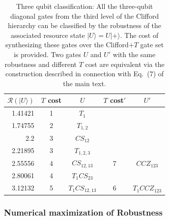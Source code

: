 \documentclass[aps,prl,twocolumn,showpacs,superscriptaddress,groupedaddress,amsmath,amssymb]{revtex4-1}  %
\def\ket #1{\vert #1\rangle}
\begin{document}
\begin{table}[h]
\centering
\begin{tabular}{rcccc}
\hline
$\mathcal{R}(\ket{U})$ & $T$ cost & $U$   & $T$ cost$'$  & $U'$  \\
\hline
1.41421 \quad  & 1 &$T_1$ &  &  \\
1.74755 \quad  & 2 &$T_{1,2}$&  &   \\
2.2     \quad  & 3 &$CS_{12}$&  & \\
2.21895 \quad  & 3 &$T_{1,2,3}$&     &         \\
2.55556 \quad  & 4 &$CS_{12,13}$ & 7  &  $CCZ_{123}$           \\
2.80061 \quad  & 4 &$T_1CS_{23}$&     &            \\
3.12132 \quad  & 5 &$T_1CS_{12,13}$ & 6  &  $T_1CCZ_{123}$          \\
\hline
\end{tabular}
\caption{\label{Tab:three_qubit_classification} Three qubit classification: All the three-qubit diagonal gates from the third level of the Clifford hierarchy can be classified by the robustness of the associated resource state $\ket{U}=U\ket{+}$. The cost of synthesizing these gates over the Clifford$+T$ gate set is provided. Two gates $U$ and $U'$ with the same robustness and different $T$ cost are equivalent via the construction described in connection with Eq.~(7) of the main text.}
\end{table}


\subsubsection{Numerical maximization of Robustness}
\end{document}
